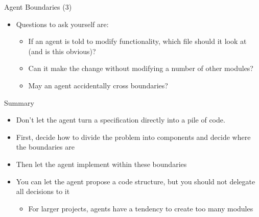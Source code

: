 \documentclass[
ps,
]{prosper}
\begin{document}
\begin{slide}{Agent Boundaries (3)}

\begin{itemize}

\item Questions to ask yourself are:

  \begin{itemize}
  
  \item If an agent is told to modify functionality, which file should it look
    at (and is this obvious)?
      
  \item Can it make the change without modifying a number of other modules?

  \item May an agent accidentally cross boundaries?
    
  \end{itemize}
  
\end{itemize}
  
\end{slide}



\begin{slide}{Summary}

\begin{itemize}

\item Don't let the agent turn a specification directly into a pile of code.

\item First, decide how to divide the problem into components and decide where
  the boundaries are

\item Then let the agent implement within these boundaries

\item You can let the agent propose a code structure, but you should not
  delegate all decisions to it

\begin{itemize}

\item For larger projects, agents have a tendency to create too many modules

\end{itemize}
  
  
\end{itemize}
  
\end{slide}
\end{document}
